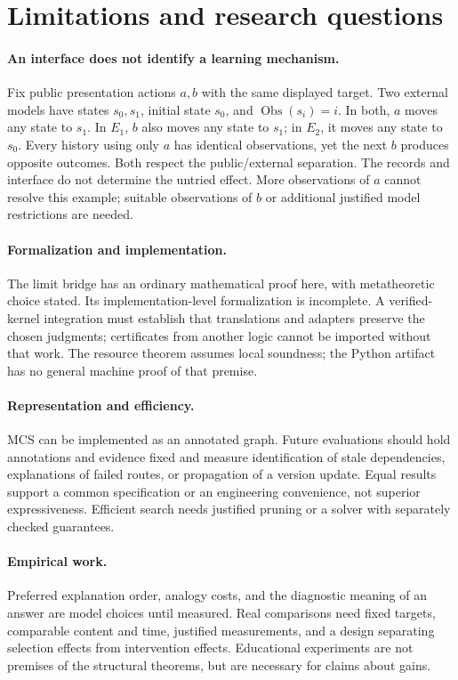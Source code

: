 \documentclass[11pt,a4paper]{article}
\theoremstyle{remark}
\begin{document}
\section{Limitations and research questions}\label{sec:limitations}
\paragraph{An interface does not identify a learning mechanism.}
Fix public presentation actions \(a,b\) with the same displayed target.
Two external models have states \(s_0,s_1\), initial state \(s_0\), and
\(\operatorname{Obs}(s_i)=i\). In both, \(a\) moves any state to \(s_1\).
In \(E_1\), \(b\) also moves any state to \(s_1\); in \(E_2\), it moves any
state to \(s_0\). Every history using only \(a\) has identical observations,
yet the next \(b\) produces opposite outcomes. Both respect the public/external
separation. The records and interface do not determine the untried effect.
More observations of \(a\) cannot resolve this example; suitable observations
of \(b\) or additional justified model restrictions are needed.

\paragraph{Formalization and implementation.}
The limit bridge has an ordinary mathematical proof here, with metatheoretic
choice stated. Its implementation-level formalization is incomplete.
A verified-kernel integration must establish that translations and adapters
preserve the chosen judgments; certificates from another logic cannot be
imported without that work. The resource theorem assumes local soundness;
the Python artifact has no general machine proof of that premise.

\paragraph{Representation and efficiency.}
MCS can be implemented as an annotated graph. Future evaluations should hold
annotations and evidence fixed and measure identification of stale
dependencies, explanations of failed routes, or propagation of a version
update. Equal results support a common specification or an engineering
convenience, not superior expressiveness. Efficient search needs justified
pruning or a solver with separately checked guarantees.

\paragraph{Empirical work.}
Preferred explanation order, analogy costs, and the diagnostic meaning of an
answer are model choices until measured. Real comparisons need fixed targets,
comparable content and time, justified measurements, and a design separating
selection effects from intervention effects. Educational experiments are not
premises of the structural theorems, but are necessary for claims about gains.
\end{document}
